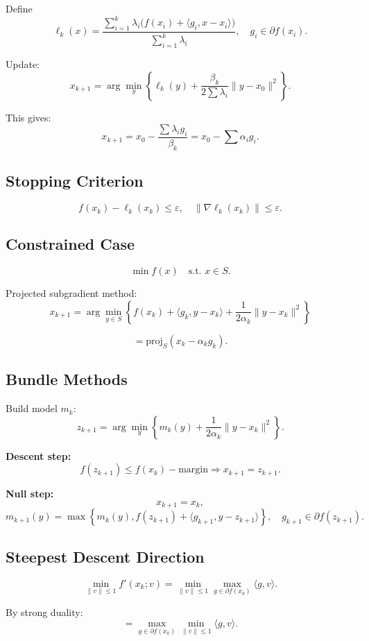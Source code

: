 \documentclass[12pt,oneside]{book}
\numberwithin{equation}{section}
\theoremstyle{definition}
\theoremstyle{plain}
\theoremstyle{remark}
\begin{document}
Define
\[
\ell_k(x) =
\frac{\sum_{i=1}^k \lambda_i \big(f(x_i) + \langle g_i, x-x_i\rangle\big)}
{\sum_{i=1}^k \lambda_i},
\quad g_i \in \partial f(x_i).
\]

Update:
\[
x_{k+1} = \arg\min_y \left\{ \ell_k(y) + \frac{\beta_k}{2\sum \lambda_i}\|y-x_0\|^2 \right\}.
\]

This gives:
\[
x_{k+1} = x_0 - \frac{\sum \lambda_i g_i}{\beta_k}
= x_0 - \sum \alpha_i g_i.
\]

\subsection*{Stopping Criterion}

\[
f(x_k) - \ell_k(x_k) \le \varepsilon,
\quad
\|\nabla \ell_k(x_k)\| \le \varepsilon.
\]

\subsection*{Constrained Case}

\[
\min f(x) \quad \text{s.t. } x \in S.
\]

Projected subgradient method:
\[
x_{k+1} =
\arg\min_{y\in S}
\left\{
f(x_k) + \langle g_k, y-x_k\rangle + \frac{1}{2\alpha_k}\|y-x_k\|^2
\right\}
\]

\[
= \mathrm{proj}_S(x_k - \alpha_k g_k).
\]

\subsection{Bundle Methods}

Build model $m_k$:
\[
z_{k+1} = \arg\min_y \left\{ m_k(y) + \frac{1}{2\alpha_k}\|y-x_k\|^2 \right\}.
\]

\textbf{Descent step:}
\[
f(z_{k+1}) \le f(x_k) - \text{margin}
\Rightarrow
x_{k+1} = z_{k+1}.
\]

\textbf{Null step:}
\[
x_{k+1} = x_k,
\]
\[
m_{k+1}(y) = \max \left\{
m_k(y),
f(z_{k+1}) + \langle g_{k+1}, y-z_{k+1}\rangle
\right\},
\quad g_{k+1}\in \partial f(z_{k+1}).
\]

\subsection*{Steepest Descent Direction}

\[
\min_{\|v\|\le1} f'(x_k;v)
=
\min_{\|v\|\le1} \max_{g\in\partial f(x_k)} \langle g,v\rangle.
\]

By strong duality:
\[
= \max_{g\in\partial f(x_k)} \min_{\|v\|\le1} \langle g,v\rangle.
\]
\end{document}
